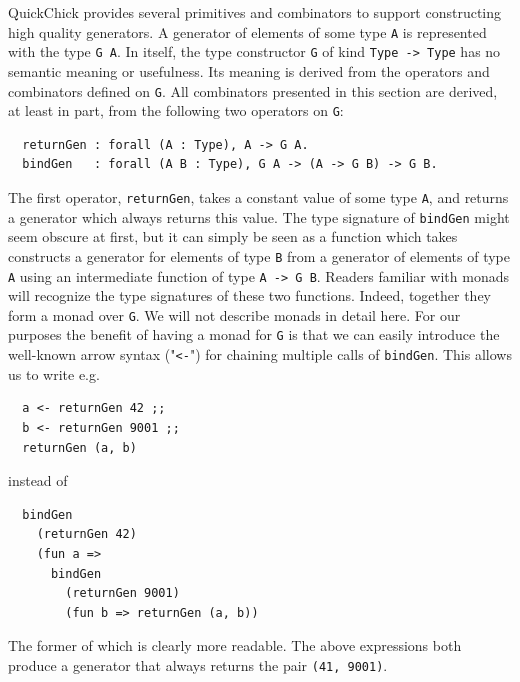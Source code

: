 \documentclass[twoside,11pt,openright]{report}
\newenvironment{code}{\captionsetup{type=figure, singlelinecheck=off, justification=raggedleft}}{}
\newcommand{\coq}[1]{\texttt{#1}}
\begin{document}
QuickChick provides several primitives and combinators to support constructing high quality generators. A generator of elements of some type \coq{A} is represented with the type \coq{G A}. In itself, the type constructor \coq{G} of kind \coq{Type -> Type} has no semantic meaning or usefulness. Its meaning is derived from the operators and combinators defined on \coq{G}. All combinators presented in this section are derived, at least in part, from the following two operators on \coq{G}:
\begin{code}
\label{def:returnGen-bindGen}
\begin{verbatim}
  returnGen : forall (A : Type), A -> G A.
  bindGen   : forall (A B : Type), G A -> (A -> G B) -> G B.
\end{verbatim}
\end{code}
The first operator, \coq{returnGen}, takes a constant value of some type \coq{A}, and returns a generator which always returns this value. The type signature of \coq{bindGen} might seem obscure at first, but it can simply be seen as a function which takes constructs a generator for elements of type \coq{B} from a generator of elements of type \coq{A} using an intermediate function of type \coq{A -> G B}. Readers familiar with monads will recognize the type signatures of these two functions. Indeed, together they form a monad over \coq{G}. We will not describe monads in detail here. 
For our purposes the benefit of having a monad for \coq{G} is that we can easily introduce the well-known arrow syntax ("\coq{<-}") for chaining multiple calls of \coq{bindGen}. This allows us to write e.g.
\begin{code}
\begin{verbatim}
  a <- returnGen 42 ;;
  b <- returnGen 9001 ;;
  returnGen (a, b)
\end{verbatim}
\end{code}
instead of 
\begin{code}
\begin{verbatim}
  bindGen 
    (returnGen 42)
    (fun a => 
      bindGen
        (returnGen 9001)
        (fun b => returnGen (a, b))
\end{verbatim}
\end{code}
The former of which is clearly more readable. The above expressions both produce a generator that always returns the pair \coq{(41, 9001)}.
\end{document}

